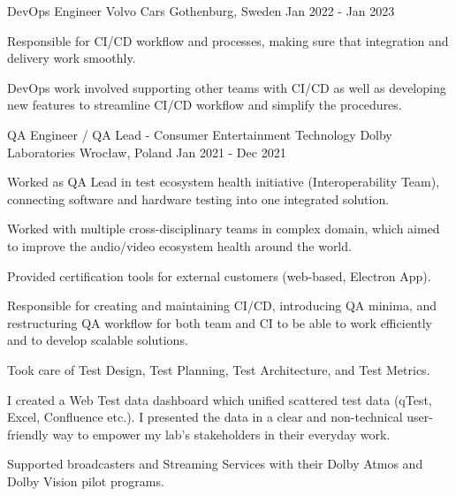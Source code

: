 \begin{cventries}
  \cventry
  {DevOps Engineer} %
  {Volvo Cars} %
  {Gothenburg, Sweden} %
  {Jan 2022 - Jan 2023} %
  {
    \begin{cvitems} %
      \item {Responsible for CI/CD workflow and processes, making sure that integration and delivery work smoothly.}
      \item {DevOps work involved supporting other teams with CI/CD as well as developing new features to streamline CI/CD workflow and simplify the procedures.}
    \end{cvitems}
  }

  \cventry
  {QA Engineer / QA Lead - Consumer Entertainment Technology} %
  {Dolby Laboratories} %
  {Wrocław, Poland} %
  {Jan 2021 - Dec 2021} %
  {
    \begin{cvitems} %
      \item {Worked as QA Lead in test ecosystem health initiative (Interoperability Team), connecting software and hardware testing into one integrated solution.}
      \item {Worked with multiple cross-disciplinary teams in complex domain, which aimed to improve the audio/video ecosystem health around the world.}
      \item {Provided certification tools for external customers (web-based, Electron App).}
      \item {Responsible for creating and maintaining CI/CD, introducing QA minima, and restructuring QA workflow for both team and CI to be able to work efficiently and to develop scalable solutions.}
      \item {Took care of Test Design, Test Planning, Test Architecture, and Test Metrics.}
      \item {I created a Web Test data dashboard which unified scattered test data (qTest, Excel, Confluence etc.). I presented the data in a clear and non-technical user-friendly way to empower my lab's stakeholders in their everyday work.}
      \item {Supported broadcasters and Streaming Services with their Dolby Atmos and Dolby Vision pilot programs.}
    \end{cvitems}
  }


\end{cventries}
